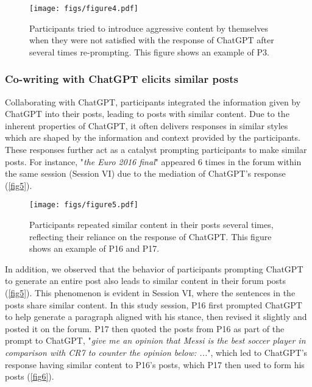 \begin{figure*}
    \centering
    \texttt{[image: figs/figure4.pdf]}
    \caption{Participants tried to introduce aggressive content by themselves when they were not satisfied with the response of ChatGPT after several times re-prompting. This figure shows an example of P3.}
    \label{fig4}
\end{figure*}

\subsubsection{Co-writing with ChatGPT elicits similar posts}

Collaborating with ChatGPT, participants integrated the information given by ChatGPT into their posts, leading to posts with similar content. Due to the inherent properties of ChatGPT, it often delivers responses in similar styles which are shaped by the information and context provided by the participants. These responses further act as a catalyst prompting participants to make similar posts. For instance, "\textit{the Euro 2016 final}" appeared 6 times in the forum within the same session (Session VI) due to the mediation of ChatGPT's response (\autoref{fig5}).


\begin{figure*}
    \centering
    \texttt{[image: figs/figure5.pdf]}
    \caption{Participants repeated similar content in their posts several times, reflecting their reliance on the response of ChatGPT. This figure shows an example of P16 and P17.}
    \label{fig5}
\end{figure*}

In addition, we observed that the behavior of participants prompting ChatGPT to generate an entire post also leads to similar content in their forum posts (\autoref{fig5}). This phenomenon is evident in Session VI, where the sentences in the posts share  similar content. In this study session, P16 first prompted ChatGPT to help generate a paragraph aligned with his stance, then revised it slightly and posted it on the forum. P17 then quoted the posts from P16 as part of the prompt to ChatGPT, "\textit{give me an opinion that Messi is the best soccer player in comparison with CR7 to counter the opinion below: ...}", which led to ChatGPT's response having  similar content to P16's posts, which P17 then used to form his posts (\autoref{fig6}).

